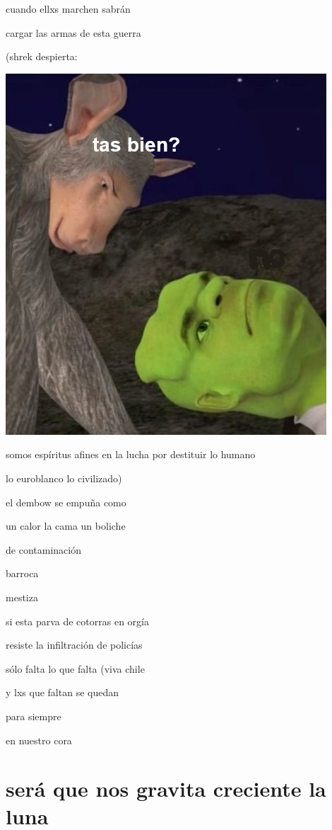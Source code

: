 \documentclass[
]{book}
\begin{document}
cuando ellxs marchen sabrán

cargar las armas de esta guerra

(shrek despierta:

\includegraphics{images/7.png}

somos espíritus afines en la lucha por destituir lo humano

lo euroblanco lo civilizado)

el dembow se empuña como

un calor la cama un boliche

de contaminación

barroca

mestiza

si esta parva de cotorras en orgía

resiste la infiltración de policías

sólo falta lo que falta (viva chile

y lxs que faltan se quedan

para siempre

en nuestro cora

\hypertarget{seruxe1-que-nos-gravita-creciente-la-luna}{%
\chapter{será que nos gravita creciente la luna}\label{seruxe1-que-nos-gravita-creciente-la-luna}}
\end{document}
